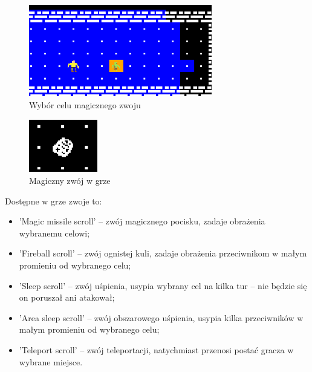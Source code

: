 \documentclass[12pt,twoside]{article}
\begin{document}
\FloatBarrier
\begin{figure}[h]
	\centering
	\includegraphics[width=8cm]{images/mygame/targeting.png}
	\caption{Wybór celu magicznego zwoju}
	\label{mygame:targeting}
\end{figure}
\FloatBarrier

\FloatBarrier
\begin{figure}[h]
	\centering
	\includegraphics[width=3cm]{images/mygame/scroll.png}
	\caption{Magiczny zwój w grze}
	\label{mygame:scroll}
\end{figure}
\FloatBarrier

Dostępne w grze zwoje to: 
\begin{itemize}
	\item 'Magic missile scroll' -- zwój magicznego pocisku, zadaje obrażenia wybranemu celowi;
	\item 'Fireball scroll' -- zwój ognistej kuli, zadaje obrażenia przeciwnikom w małym promieniu od wybranego celu;			
	\item 'Sleep scroll' -- zwój uśpienia, usypia wybrany cel na kilka tur -- nie będzie się on poruszał ani atakował;
	\item 'Area sleep scroll' -- zwój obszarowego uśpienia, usypia kilka przeciwników w małym promieniu od wybranego celu;
	\item 'Teleport scroll' -- zwój teleportacji, natychmiast przenosi postać gracza w wybrane miejsce.	
\end{itemize}
\end{document}
